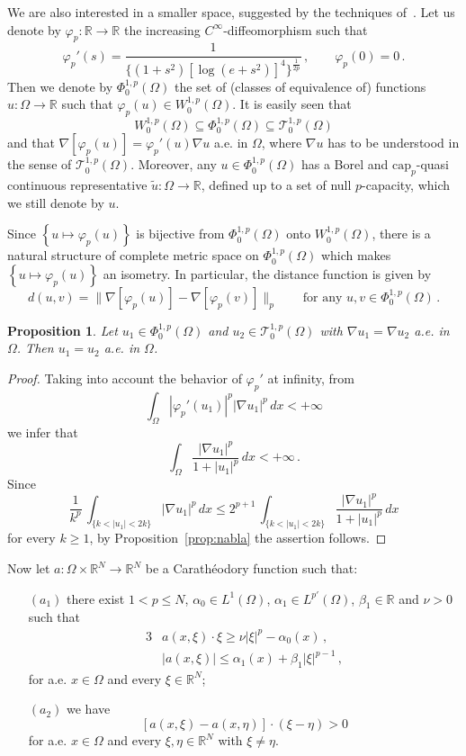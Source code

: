 \documentclass[twoside,reqno]{amsart}
\numberwithin{equation}{section}
\newtheorem{prop}[thm]{Proposition}
\theoremstyle{definition}
\newcommand{\R}{\mathbb{R}}
\begin{document}
%
We are also interested in a smaller space, 
suggested by the techniques 
of~\cite{boccardo_gallouet1989, boccardo_gallouet1992, orsina1993}.
Let us denote by $\varphi_p:\R\rightarrow\R$ the increasing 
$C^\infty$-diffeomorphism such that
\[
\varphi_p'(s) = \frac{1}{\{(1+s^2)[\log(e+s^2)]^4
\}^{\frac{1}{2p}}}
\,,\qquad\varphi_p(0)=0\,.
\]
Then we denote by $\Phi^{1,p}_0(\Omega)$ the set of
(classes of equivalence of) functions $u:\Omega\rightarrow\R$ 
such that $\varphi_p(u)\in W^{1,p}_0(\Omega)$.
It is easily seen that 
\[
W^{1,p}_0(\Omega) \subseteq \Phi^{1,p}_0(\Omega)
\subseteq \mathcal{T}^{1,p}_0(\Omega)
\]
and that $\nabla[\varphi_p(u)] = \varphi_p'(u)\nabla u$
a.e. in $\Omega$, where $\nabla u$ has to be understood
in the sense of $\mathcal{T}^{1,p}_0(\Omega)$.
Moreover, any $u\in\Phi^{1,p}_0(\Omega)$ has a Borel and
$\mathrm{cap}_p$-quasi continuous representative
$\tilde{u}:\Omega\rightarrow\R$, defined up to 
a set of null $p$-capacity, which we still denote by $u$.
\par
Since $\left\{u\mapsto \varphi_p(u)\right\}$
is bijective from $\Phi^{1,p}_0(\Omega)$
onto $W^{1,p}_0(\Omega)$, there is a natural structure of
complete metric space on $\Phi^{1,p}_0(\Omega)$ which makes 
$\left\{u\mapsto \varphi_p(u)\right\}$
an isometry.
In particular, the distance function is given by
\[
d(u,v) = \|\nabla[\varphi_p(u)]-\nabla[\varphi_p(v)]\|_p
\qquad\text{for any $u,v \in \Phi^{1,p}_0(\Omega)$}\,.
\]
%
\begin{prop}
\label{prop:nablaphi}
Let $u_1 \in \Phi^{1,p}_0(\Omega)$ and 
$u_2 \in \mathcal{T}^{1,p}_0(\Omega)$
with $\nabla u_1 = \nabla u_2$ a.e. in $\Omega$.
Then $u_1 = u_2$ a.e. in $\Omega$.
\end{prop}
%
\begin{proof}
Taking into account the behavior of $\varphi_p'$ at
infinity, from
\[
\int_\Omega |\varphi_p'(u_1)|^p |\nabla u_1|^p\,dx <+\infty
\]
we infer that
\[
\int_\Omega \frac{|\nabla u_1|^p}{1+|u_1|^p}\,dx <+\infty\,.
\]
Since
\[
\frac{1}{k^p}\,
\int_{\{k<|u_1|<2k\}} |\nabla u_1|^p\,dx  \leq
2^{p+1}\,
\int_{\{k<|u_1|<2k\}} \frac{|\nabla u_1|^p}{1+|u_1|^p}\,dx
\]
for every $k\geq 1$, 
by Proposition~\ref{prop:nabla} the assertion follows.
\end{proof}
%
\par
Now let $a:\Omega\times\R^N\rightarrow\R^N$ be a Carath\'eodory 
function such that:
\begin{itemize}
\item[$(a_1)$]
there exist $1<p\leq N$, $\alpha_0\in L^1(\Omega)$, 
$\alpha_1\in L^{p'}(\Omega)$, $\beta_1\in\R$ and $\nu>0$
such that
\begin{alignat*}{3}
&a(x,\xi)\cdot\xi \geq \nu |\xi|^p - \alpha_0(x)\,,\\
&|a(x,\xi)| \leq \alpha_1(x) + \beta_1|\xi|^{p-1} \,,
\end{alignat*}
for a.e. $x\in\Omega$ and every $\xi\in\R^N$;
\item[$(a_2)$]
we have
\[
[a(x,\xi)-a(x,\eta)]\cdot(\xi-\eta) >0
\]
for a.e. $x\in\Omega$ and every $\xi,\eta\in\R^N$
with $\xi\neq\eta$.
\end{itemize}
\end{document}
